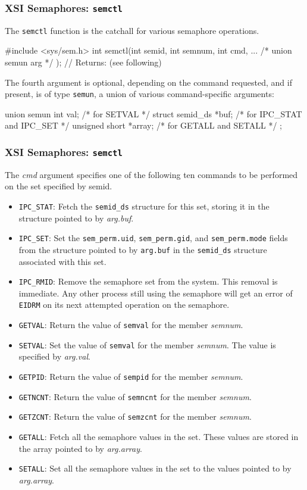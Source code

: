 \documentclass[newPxFont,sthlmFooter,nooffset]{beamer}
\begin{document}
\begin{frame}[t, fragile]
  \frametitle{XSI Semaphores: \texttt{semctl}}
The \texttt{semctl} function is the catchall for various semaphore operations.
\begin{codedef}
#include <sys/sem.h>
int semctl(int semid, int semnum, int cmd, ... /* union semun arg */ );
// Returns: (see following)  
\end{codedef}

The fourth argument is optional, depending on the command requested, and if present, is of type \texttt{semun}, a union of various command-specific arguments:

\begin{codedefnb}
union semun { 
    int             val;           /* for SETVAL */ 
    struct          semid_ds *buf; /* for IPC_STAT and IPC_SET */ 
    unsigned short *array;         /* for GETALL and SETALL */ };
\end{codedefnb}

\end{frame}



\begin{frame}[t]
  \frametitle{XSI Semaphores: \texttt{semctl}}
The \textit{cmd} argument specifies one of the following ten commands to be performed on the set specified by semid.
{\scriptsize
\begin{itemize}
\item \texttt{IPC\_STAT}: Fetch the \texttt{semid\_ds} structure for this set, storing it in the structure pointed to by \textit{arg.buf}.
\item \texttt{IPC\_SET}: Set the \texttt{sem\_perm.uid}, \texttt{sem\_perm.gid}, and \texttt{sem\_perm.mode} fields from the structure pointed to by \texttt{arg.buf} in the \texttt{semid\_ds} structure associated with this set. 
\item \texttt{IPC\_RMID}: Remove the semaphore set from the system. This removal is immediate. Any other process still using the semaphore will get an error of \texttt{EIDRM} on its next attempted operation on the semaphore. 
\item \texttt{GETVAL}: Return the value of \texttt{semval} for the member \textit{semnum}.
\item \texttt{SETVAL}: Set the value of \texttt{semval} for the member \textit{semnum}. The value is specified by \textit{arg.val}.
\item \texttt{GETPID}: Return the value of \texttt{sempid} for the member \textit{semnum}.
\item \texttt{GETNCNT}: Return the value of \texttt{semncnt} for the member \textit{semnum}.
\item \texttt{GETZCNT}: Return the value of \texttt{semzcnt} for the member \textit{semnum}.
\item \texttt{GETALL}: Fetch all the semaphore values in the set. These values are stored in the array pointed to by \textit{arg.array}.
\item \texttt{SETALL}: Set all the semaphore values in the set to the values pointed to by \textit{arg.array}.
\end{itemize}
}
\end{frame}
\end{document}
